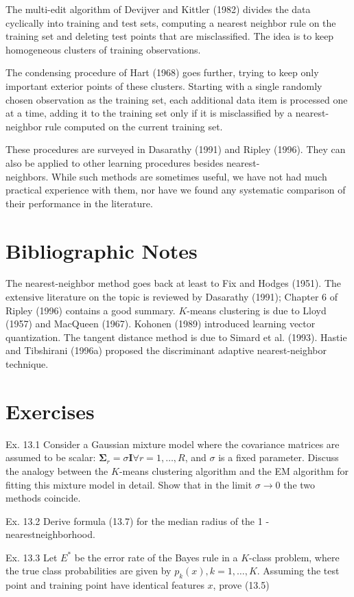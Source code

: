 \documentclass[10pt]{article}
\begin{document}
The multi-edit algorithm of Devijver and Kittler (1982) divides the data cyclically into training and test sets, computing a nearest neighbor rule on the training set and deleting test points that are misclassified. The idea is to keep homogeneous clusters of training observations.

The condensing procedure of Hart (1968) goes further, trying to keep only important exterior points of these clusters. Starting with a single randomly chosen observation as the training set, each additional data item is processed one at a time, adding it to the training set only if it is misclassified by a nearest-neighbor rule computed on the current training set.

These procedures are surveyed in Dasarathy (1991) and Ripley (1996). They can also be applied to other learning procedures besides nearest-\\
neighbors. While such methods are sometimes useful, we have not had much practical experience with them, nor have we found any systematic comparison of their performance in the literature.

\section*{Bibliographic Notes}
The nearest-neighbor method goes back at least to Fix and Hodges (1951). The extensive literature on the topic is reviewed by Dasarathy (1991); Chapter 6 of Ripley (1996) contains a good summary. $K$-means clustering is due to Lloyd (1957) and MacQueen (1967). Kohonen (1989) introduced learning vector quantization. The tangent distance method is due to Simard et al. (1993). Hastie and Tibshirani (1996a) proposed the discriminant adaptive nearest-neighbor technique.

\section*{Exercises}
Ex. 13.1 Consider a Gaussian mixture model where the covariance matrices are assumed to be scalar: $\boldsymbol{\Sigma}_{r}=\sigma \mathbf{I} \forall r=1, \ldots, R$, and $\sigma$ is a fixed parameter. Discuss the analogy between the $K$-means clustering algorithm and the EM algorithm for fitting this mixture model in detail. Show that in the limit $\sigma \rightarrow 0$ the two methods coincide.

Ex. 13.2 Derive formula (13.7) for the median radius of the 1 -nearestneighborhood.

Ex. 13.3 Let $E^{*}$ be the error rate of the Bayes rule in a $K$-class problem, where the true class probabilities are given by $p_{k}(x), k=1, \ldots, K$. Assuming the test point and training point have identical features $x$, prove (13.5)
\end{document}
